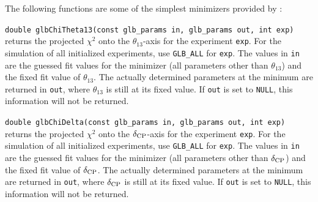 The following functions are some of the simplest minimizers 
provided by \GLOBES :
\begin{function}
{\tt double glbChiTheta13(const glb\_params in, glb\_params out, int exp)}
returns the projected $\chi^2$ onto the $\theta_{13}$-axis for the  experiment {\tt exp}. For the simulation of all initialized experiments,
use {\tt GLB\_ALL} for {\tt exp}. The values in {\tt in} are the guessed fit values for the minimizer (all parameters other than $\theta_{13}$) and the fixed fit value of $\theta_{13}$. The actually determined parameters at the minimum are returned in {\tt out}, where $\theta_{13}$ is still at
its fixed value. If {\tt out} is set to {\tt NULL}, this information will not be returned.
\end{function}
\begin{function}
{\tt double glbChiDelta(const glb\_params in, glb\_params out, int exp)}
returns the projected $\chi^2$ onto the $\delta_{\mathrm{CP}}$-axis for the  experiment {\tt exp}. For the simulation of all initialized experiments,
use {\tt GLB\_ALL} for {\tt exp}. The values in {\tt in} are the guessed fit values for the minimizer (all parameters other than $\delta_{\mathrm{CP}}$) and the fixed fit value of $\delta_{\mathrm{CP}}$. The actually determined parameters at the minimum are returned in {\tt out}, where $\delta_{\mathrm{CP}}$ is still at its fixed value. If {\tt out} is set to {\tt NULL}, this information will not be returned.
\end{function}

